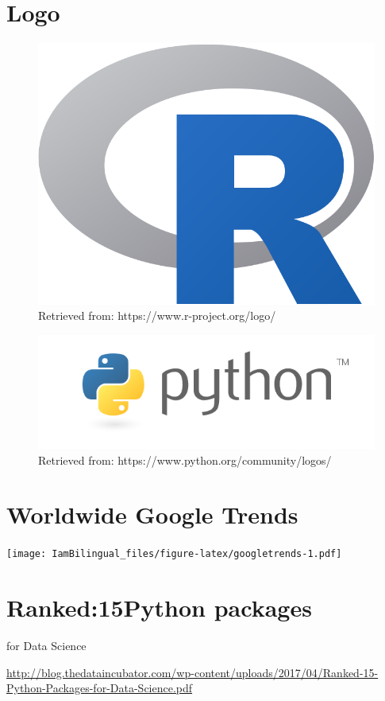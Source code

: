 \documentclass[]{book}
\begin{document}
\hypertarget{logo}{%
\section{Logo}\label{logo}}

\begin{figure}

{\centering \includegraphics[width=0.3\linewidth]{fig/C1_Rlogo} 

}

\caption{Retrieved from: https://www.r-project.org/logo/}\label{fig:unnamed-chunk-1}
\end{figure}

\begin{figure}

{\centering \includegraphics[width=0.6\linewidth]{fig/C1_Pythonlogo} 

}

\caption{Retrieved from: https://www.python.org/community/logos/}\label{fig:unnamed-chunk-2}
\end{figure}

\hypertarget{worldwide-google-trends}{%
\section{Worldwide Google Trends}\label{worldwide-google-trends}}

\texttt{[image: IamBilingual\_files/figure-latex/googletrends-1.pdf]}

\hypertarget{ranked15python-packages}{%
\section{Ranked:15Python packages}\label{ranked15python-packages}}

for Data Science

\url{http://blog.thedataincubator.com/wp-content/uploads/2017/04/Ranked-15-Python-Packages-for-Data-Science.pdf}
\end{document}
